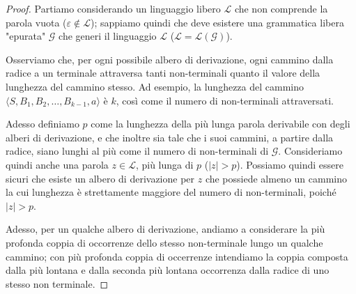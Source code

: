 \documentclass[class=book, crop=false, oneside, 12pt]{standalone}
\begin{document}
\begin{proof}
  Partiamo considerando un linguaggio libero \(\mathcal{L}\) che non comprende la parola vuota (\(\varepsilon \notin \mathcal{L}\)); sappiamo quindi che deve esistere una grammatica libera "epurata" \(\mathcal{G}\) che generi il linguaggio \(\mathcal{L}\) (\(\mathcal{L} = \mathcal{L(G)}\)).

  Osserviamo che, per ogni possibile albero di derivazione, ogni cammino dalla radice a un terminale attraversa tanti non-terminali quanto il valore della lunghezza del cammino stesso. Ad esempio, la lunghezza del cammino \(\langle S, B_1, B_2, \ldots, B_{k-1}, a \rangle\) è \(k\), così come il numero di non-terminali attraversati.

  Adesso definiamo \(p\) come la lunghezza della più lunga parola derivabile con degli alberi di derivazione, e che inoltre sia tale che i suoi cammini, a partire dalla radice, siano lunghi al più come il numero di non-terminali di \(\mathcal{G}\). Consideriamo quindi anche una parola \(z \in \mathcal{L}\), più lunga di \(p\) (\(|z| > p\)). Possiamo quindi essere sicuri che esiste un albero di derivazione per \(z\) che possiede almeno un cammino la cui lunghezza è strettamente maggiore del numero di non-terminali, poiché \(|z| >p\).

  Adesso, per un qualche albero di derivazione, andiamo a considerare la più profonda coppia di occorrenze dello stesso non-terminale lungo un qualche cammino; con più profonda coppia di occerrenze intendiamo la coppia composta dalla più lontana e dalla seconda più lontana occorrenza dalla radice di uno stesso non terminale.


\end{proof}
\end{document}
